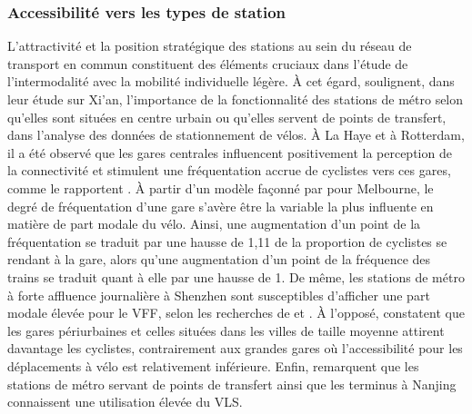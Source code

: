 \begin{refsegment}
\subsubsection*{Accessibilité vers les types de station
    \label{chap2:accessibilite-types-stations}
    }
    
L'attractivité et la position stratégique des stations au sein du réseau de transport en commun constituent des éléments cruciaux dans l'étude de l'intermodalité avec la mobilité individuelle légère. À cet égard, \textcolor{blue}{\textcite[1934]{chen_study_2013}} soulignent, dans leur étude sur Xi'an, l'importance de la fonctionnalité des stations de métro selon qu'elles sont situées en centre urbain ou qu'elles servent de points de transfert, dans l'analyse des données de stationnement de vélos. À La Haye et à Rotterdam, il a été observé que les gares centrales influencent positivement la perception de la connectivité et stimulent une fréquentation accrue de cyclistes vers ces gares, comme le rapportent \textcolor{blue}{\textcite[494]{la_paix_puello_role_2021}}. À partir d'un modèle façonné par \textcolor{blue}{\textcite[401]{weliwitiya_bicycle_2019}} pour Melbourne, le degré de fréquentation d'une gare s'avère être la variable la plus influente en matière de part modale du vélo. Ainsi, une augmentation d'un point de la fréquentation se traduit par une hausse de 1,11 de la proportion de cyclistes se rendant à la gare, alors qu'une augmentation d'un point de la fréquence des trains se traduit quant à elle par une hausse de 1. De même, les stations de métro à forte affluence journalière à Shenzhen sont susceptibles d'afficher une part modale élevée pour le \acrshort{VFF}, selon les recherches de \textcolor{blue}{\textcite[12]{guo_built_2020}} et \textcolor{blue}{\textcite[388]{guo_role_2021}}. À l'opposé, \textcolor{blue}{\textcite[397]{la_paix_puello_integration_2016}} constatent que les gares périurbaines et celles situées dans les villes de taille moyenne attirent davantage les cyclistes, contrairement aux grandes gares où l'accessibilité pour les déplacements à vélo est relativement inférieure. Enfin, \textcolor{blue}{\textcite[9]{cheng_promoting_2022}} remarquent que les stations de métro servant de points de transfert ainsi que les terminus à Nanjing connaissent une utilisation élevée du \acrshort{VLS}.%


\end{refsegment}
